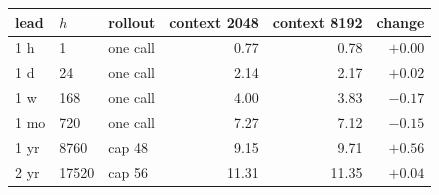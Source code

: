 \begin{tabular}{lllrrr}
\toprule
lead & $h$ & rollout & context 2048 & context 8192 & change \\
\midrule
1 h & 1 & one call & 0.77 & 0.78 & $+0.00$ \\
1 d & 24 & one call & 2.14 & 2.17 & $+0.02$ \\
1 w & 168 & one call & 4.00 & 3.83 & $-0.17$ \\
1 mo & 720 & one call & 7.27 & 7.12 & $-0.15$ \\
1 yr & 8760 & cap 48 & 9.15 & 9.71 & $+0.56$ \\
2 yr & 17520 & cap 56 & 11.31 & 11.35 & $+0.04$ \\
\bottomrule
\end{tabular}
